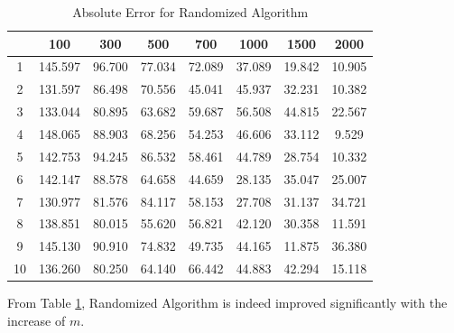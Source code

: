 \documentclass{article}
\begin{document}
\begin{table}[htbp]
	\centering
	\caption{Absolute Error for Randomized Algorithm}
	\begin{tabular}{cccccccc}
		\toprule
		\multicolumn{1}{p{11.165em}}{\diagbox{Test Number}{Order}} & 100   & 300   & 500   & 700   & 1000  & 1500  & 2000 \\
		\midrule
		1     & 145.597 & 96.700 & 77.034 & 72.089 & 37.089 & 19.842 & 10.905 \\
		2     & 131.597 & 86.498 & 70.556 & 45.041 & 45.937 & 32.231 & 10.382 \\
		3     & 133.044 & 80.895 & 63.682 & 59.687 & 56.508 & 44.815 & 22.567 \\
		4     & 148.065 & 88.903 & 68.256 & 54.253 & 46.606 & 33.112 & 9.529 \\
		5     & 142.753 & 94.245 & 86.532 & 58.461 & 44.789 & 28.754 & 10.332 \\
		6     & 142.147 & 88.578 & 64.658 & 44.659 & 28.135 & 35.047 & 25.007 \\
		7     & 130.977 & 81.576 & 84.117 & 58.153 & 27.708 & 31.137 & 34.721 \\
		8     & 138.851 & 80.015 & 55.620 & 56.821 & 42.120 & 30.358 & 11.591 \\
		9     & 145.130 & 90.910 & 74.832 & 49.735 & 44.165 & 11.875 & 36.380 \\
		10    & 136.260 & 80.250 & 64.140 & 66.442 & 44.883 & 42.294 & 15.118 \\
		\bottomrule
	\end{tabular}%
	\label{tab2}%
\end{table}%
From Table \ref{tab2}, Randomized Algorithm is indeed improved significantly with the increase of $m$.
\end{document}
